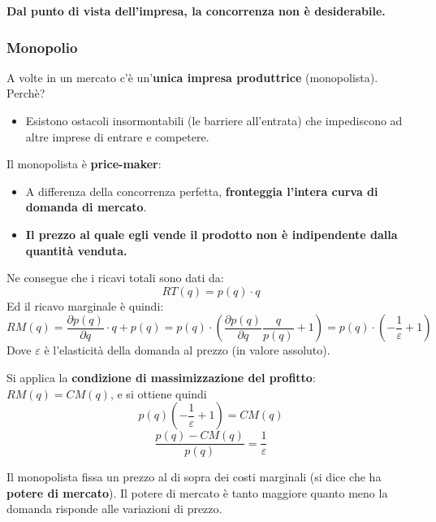 \documentclass[../main.tex]{subfiles}
\begin{document}
\textbf{Dal punto di vista dell'impresa, la concorrenza non è desiderabile.}

\subsubsection{Monopolio}

A volte in un mercato c'è un'\textbf{unica impresa produttrice} (monopolista). Perchè?
\begin{itemize}
    \item Esistono ostacoli insormontabili (le barriere all'entrata) che impediscono ad altre imprese di entrare e competere.
\end{itemize}

Il monopolista è \textbf{price-maker}:
\begin{itemize}
    \item A differenza della concorrenza perfetta, \textbf{fronteggia l'intera curva di domanda di mercato}.
    \item \textbf{Il prezzo al quale egli vende il prodotto non è indipendente dalla quantità venduta.}
\end{itemize}

Ne consegue che i ricavi totali sono dati da:
$$RT(q) = p(q)\cdot q$$
Ed il ricavo marginale è quindi:
$$
RM(q)=\frac{\partial p(q)}{\partial q}\cdot q + p(q) = p(q)\cdot \left(\frac{\partial p(q)}{\partial q}\frac{q}{p(q)}+1\right)=p(q)\cdot \left(-\frac{1}{\varepsilon}+1\right)
$$
Dove $\varepsilon$ è l'elasticità della domanda al prezzo (in valore assoluto).

Si applica la \textbf{condizione di massimizzazione del profitto}: $RM(q) = CM(q)$, e si ottiene quindi
$$p(q) \left(-\frac{1}{\varepsilon}+1\right)=CM(q)$$
$$\frac{p(q)-CM(q)}{p(q)} = \frac{1}{\varepsilon}$$

Il monopolista fissa un prezzo al di sopra dei costi marginali (si dice che ha \textbf{potere di mercato}). Il potere di mercato è tanto maggiore quanto meno la domanda risponde alle variazioni di prezzo.
\end{document}

